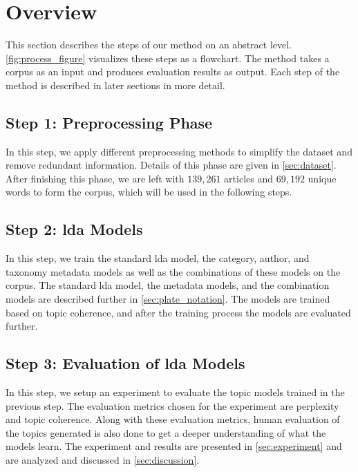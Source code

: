 \section{Overview}\label{sec:overview}
This section describes the steps of our method on an abstract level.
\autoref{fig:process_figure} visualizes these steps as a flowchart.
The method takes a corpus as an input and produces evaluation results as output.
Each step of the method is described in later sections in more detail.

\subsection*{Step 1: Preprocessing Phase}
In this step, we apply different preprocessing methods to simplify the dataset and remove redundant information.
Details of this phase are given in \autoref{sec:dataset}.
After finishing this phase, we are left with $139,261$ articles and $69,192$ unique words to form the corpus, which will be used in the following steps.

\subsection*{Step 2: \Gls{lda} Models}
In this step, we train the standard \gls{lda} model, the category, author, and taxonomy metadata models as well as the combinations of these models on the corpus.
The standard \gls{lda} model, the metadata models, and the combination models are described further in \autoref{sec:plate_notation}.
The models are trained based on topic coherence, and after the training process the models are evaluated further.

\subsection*{Step 3: Evaluation of \gls{lda} Models}
In this step, we setup an experiment to evaluate the topic models trained in the previous step.
The evaluation metrics chosen for the experiment are perplexity and topic coherence.
Along with these evaluation metrics, human evaluation of the topics generated is also done to get a deeper understanding of what the models learn.
The experiment and results are presented in \autoref{sec:experiment} and are analyzed and discussed in \autoref{sec:discussion}.



